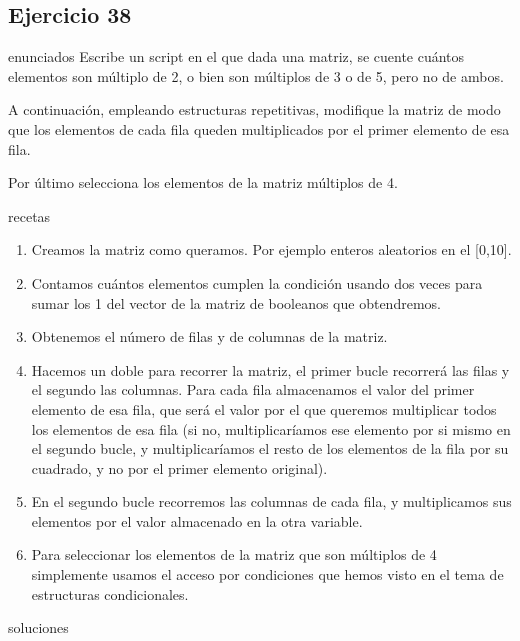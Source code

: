 \subsection{Ejercicio 38}
\def\parte{enunciados}
\ifx\capitulo\parte
Escribe un script en el que dada una matriz, se cuente cuántos elementos son múltiplo de 2, o bien son múltiplos de 3 o de 5, pero no de ambos.

A continuación, empleando estructuras repetitivas, modifique la matriz de modo que los elementos de cada fila queden multiplicados por el primer elemento de esa fila.

Por último selecciona los elementos de la matriz múltiplos de 4.
\fi

\def\parte{recetas}
\ifx\capitulo\parte
\begin{enumerate}
\item Creamos la matriz como queramos. Por ejemplo enteros aleatorios en el [0,10].
\item Contamos cuántos elementos cumplen la condición usando  dos veces para sumar los 1 del vector de la matriz de booleanos que obtendremos.
\item Obtenemos el número de filas y de columnas de la matriz.
\item Hacemos un  doble para recorrer la matriz, el primer bucle recorrerá las filas y el segundo las columnas. Para cada fila almacenamos el valor del primer elemento de esa fila, que será el valor por el que queremos multiplicar todos los elementos de esa fila (si no, multiplicaríamos ese elemento por si mismo en el segundo bucle, y multiplicaríamos el resto de los elementos de la fila por su cuadrado, y no por el primer elemento original).
\item En el segundo bucle recorremos las columnas de cada fila, y multiplicamos sus elementos por el valor almacenado en la otra variable.
\item Para seleccionar los elementos de la matriz que son múltiplos de 4 simplemente usamos el acceso por condiciones que hemos visto en el tema de estructuras condicionales.
\end{enumerate}
\fi

\def\parte{soluciones}
\ifx\capitulo\parte

\fi

